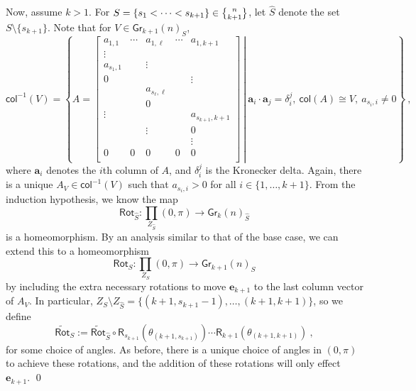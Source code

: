 \documentclass{article}
\newcommand{\msf}[1]{\mathsf{#1}}
\newcommand{\mbf}[1]{\mathbf{#1}}
\newcommand{\gr}{\msf{Gr}}
\newcommand{\nchoosek}{\textstyle\genfrac{\lbrace}{\rbrace}{0pt}{}}
\newcommand{\rot}{\msf{Rot}}
\newcommand{\trot}{\widetilde{\msf{Rot}}}
\newcommand{\col}{\msf{col}}
\newcommand{\e}{\mbf{e}}
\theoremstyle{definition}
\begin{document}
Now, assume $k>1$. For $S=\{s_1< \cdots<s_{k+1}\} \in \nchoosek{n}{k+1}$, let $\widehat{S}$ denote the set
$S \setminus \{s_{k+1}\}$. Note that for $V \in \gr_{k+1}(n)_S$,
$$\col^{-1}(V) = \left\{ \left. A=\begin{bmatrix} a_{1,1} & \cdots & a_{1,\ell} & \cdots & a_{1,k+1} \\
                                                                                        \vdots &  &  & & \\
                                                                                        a_{s_1,1} & & \vdots & &  \\
                                                                                        0 & &  & & \vdots\\
                                                                                         & & a_{s_\ell,\ell} & & \\
                                                                                         & & 0 & &  \\
                                                                                         \vdots & & & & a_{s_{k+1},k+1} \\
                                                                                         & & \vdots & & 0\\
                                                                                         & & & & \vdots \\
                                                                                         0 & 0 & 0 & 0 & 0\\
                                                            \end{bmatrix} ~\right\vert~ \mbf{a}_i \cdot \mbf{a}_j =\delta_i^j,~
                                                            \msf{col}(A) \cong V,~a_{s_i,i} \neq 0 \right\}~,$$
where $\mbf{a}_i$ denotes the $i$th column of $A$, and $\delta_i^j$ is the Kronecker delta. Again, there is a
unique $A_V \in \col^{-1}(V)$ such that $a_{s_i,i} >0$ for all $i \in \{1, \dots, k+1\}$.
From the induction hypothesis, we know the map
$$\rot_{\widehat{S}} : \prod_{Z_{\widehat{S}}} (0,\pi) \to \gr_k(n)_{\widehat{S}}$$
is a homeomorphism. By an analysis similar to that of the base case, we can extend this to a homeomorphism
$$\rot_S : \prod_{Z_S} (0,\pi) \to \gr_{k+1}(n)_S$$
by including the extra necessary rotations to move $\e_{k+1}$ to the last column vector of $A_V$. 
In particular, $Z_S \setminus Z_{\widehat{S}} = \{(k+1, s_{k+1}-1), \dots, (k+1,k+1)\}$, so we define
$$\trot_S := \trot_{\widehat{S}} \circ \msf{R}_{s_{k+1}}(\theta_{(k+1,s_{k+1})}) \cdots 
    \msf{R}_{k+1}(\theta_{(k+1,k+1)})~,$$
for some choice of angles. As before, there is a unique choice of angles in $(0,\pi)$ to achieve these rotations, and
the addition of these rotations will only effect $\e_{k+1}$.
\qed \\
\end{document}
